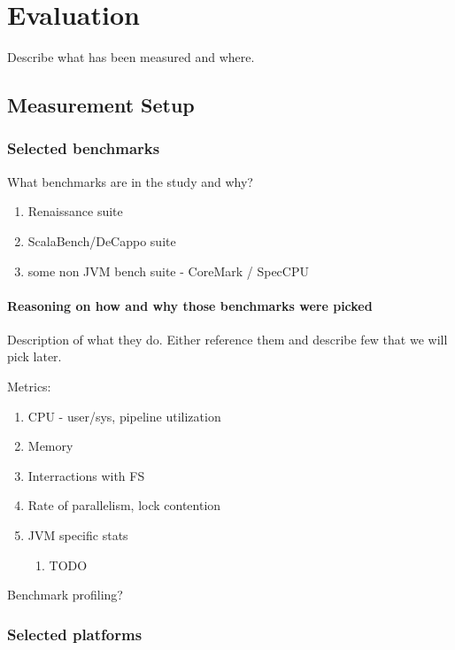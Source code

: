 \chapter{Evaluation}
\label{chap:evaluation}

Describe what has been measured and where.


\section{Measurement Setup}

\subsection{Selected benchmarks}

What benchmarks are in the study and why?

\begin{enumerate}
  \item Renaissance suite
  \item ScalaBench/DeCappo suite
  \item some non JVM bench suite - CoreMark / SpecCPU
\end{enumerate}

\subsubsection{Reasoning on how and why those benchmarks were picked}

Description of what they do. Either reference them and describe few that we will pick later.

Metrics:
\begin{enumerate}
  \item CPU - user/sys, pipeline utilization
  \item Memory
  \item Interractions with FS
  \item Rate of parallelism, lock contention
  \item JVM specific stats
        \begin{enumerate}
          \item TODO
        \end{enumerate}
\end{enumerate}

Benchmark profiling?

\subsection{Selected platforms}

